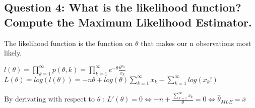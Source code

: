 \documentclass[]{article}
\begin{document}
\hypertarget{question-4-what-is-the-likelihood-function-compute-the-maximum-likelihood-estimator.}{%
\subsection{Question 4: What is the likelihood function? Compute the
Maximum Likelihood
Estimator.}\label{question-4-what-is-the-likelihood-function-compute-the-maximum-likelihood-estimator.}}

The likelihood function is the function on \(\theta\) that makes our n
observations most likely.

\(l(\theta) = \prod_{k=1}^{\infty} p(\theta,k) = \prod_{k=1}^{\infty} e^{-\theta} \frac{\theta^{x_{k}}}{x_{k}}\)
\(L(\theta) = log(l(\theta)) = -n\theta + log(\theta)\sum_{k=1}^{\infty}x_{k}-\sum_{k=1}^{\infty}log(x_{k}!)\)

By derivating with respect to \(\theta\) :
\(\begin{equation} L'(\theta) = 0 \iff -n +\frac{\sum_{k=1}^{\infty}x_{k}}{\theta} = 0 \iff \hat\theta_{MLE} \end{equation} = \overline{x}\)
\end{document}
